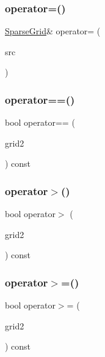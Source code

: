 \subsubsection{\texorpdfstring{operator=()}{operator=()}}
{\footnotesize\ttfamily \mbox{\hyperlink{classSparseGrid}{Sparse\+Grid}}\& operator= (\begin{DoxyParamCaption}\item[{const \mbox{\hyperlink{classSparseGrid}{Sparse\+Grid}}$<$ Value\+Type $>$ \&}]{src }\end{DoxyParamCaption})\hspace{0.3cm}{\ttfamily [inline]}}

\mbox{\label{classSparseGrid_adca16e99b3494de035a2e6e61ebb27a5}} 
\subsubsection{\texorpdfstring{operator==()}{operator==()}}
{\footnotesize\ttfamily bool operator== (\begin{DoxyParamCaption}\item[{const \mbox{\hyperlink{classSparseGrid}{Sparse\+Grid}}$<$ Value\+Type $>$ \&}]{grid2 }\end{DoxyParamCaption}) const}

\mbox{\label{classSparseGrid_a2ab4ffeb5dd21aea609c82c1dcc0fd8e}} 
\subsubsection{\texorpdfstring{operator$>$()}{operator>()}}
{\footnotesize\ttfamily bool operator$>$ (\begin{DoxyParamCaption}\item[{const \mbox{\hyperlink{classSparseGrid}{Sparse\+Grid}}$<$ Value\+Type $>$ \&}]{grid2 }\end{DoxyParamCaption}) const}

\mbox{\label{classSparseGrid_a05fabc042df451915478a358ebf9d1e1}} 
\subsubsection{\texorpdfstring{operator$>$=()}{operator>=()}}
{\footnotesize\ttfamily bool operator$>$= (\begin{DoxyParamCaption}\item[{const \mbox{\hyperlink{classSparseGrid}{Sparse\+Grid}}$<$ Value\+Type $>$ \&}]{grid2 }\end{DoxyParamCaption}) const}

